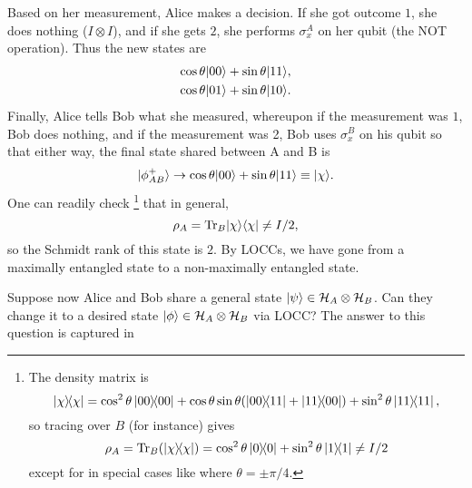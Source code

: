 Based on her measurement, Alice makes a decision. If she got outcome $1$, she does nothing ($I\otimes I$), and if she gets $2$, she performs $\sigma_x^A$ on her qubit (the NOT operation). Thus the new states are
\begin{gather*}
    \cos\theta \lvert00\rangle+\sin\theta\lvert11\rangle,\\
    \cos\theta \lvert01\rangle + \sin\theta\lvert10\rangle.
\end{gather*}
Finally, Alice tells Bob what she measured, whereupon if the measurement was $1$, Bob does nothing, and if the measurement was 2, Bob uses $\sigma_x^B$ on his qubit so that either way, the final state shared between A and B is
\begin{equation}
    \lvert\phi_{AB}^+\rangle \to \cos\theta \lvert00\rangle + \sin\theta\lvert11\rangle \equiv \lvert\chi\rangle.
\end{equation}
One can readily check%
    \footnote{The density matrix is 
    \begin{equation*}
        \left\lvert{\chi}\middle\rangle\!\middle\langle{\chi}\right\rvert=\cos^2\theta \left\lvert{00}\middle\rangle\!\middle\langle{00}\right\rvert+\cos\theta\sin\theta(\left\lvert 00 \middle\rangle\!\middle\langle 11 \right\rvert+\left\lvert 11 \middle\rangle\!\middle\langle 00 \right\rvert)+\sin^2\theta \left\lvert{11}\middle\rangle\!\middle\langle{11}\right\rvert,
    \end{equation*}
    so tracing over $B$ (for instance) gives
    \begin{equation*}
        \rho_A = \operatorname{Tr}_B(\left\lvert{\chi}\middle\rangle\!\middle\langle{\chi}\right\rvert) = \cos^2\theta \left\lvert{0}\middle\rangle\!\middle\langle{0}\right\rvert+\sin^2\theta \left\lvert{1}\middle\rangle\!\middle\langle{1}\right\rvert \neq I/2
    \end{equation*}
except for in special cases like where $\theta=\pm \pi/4$.
    }
that in general,
\begin{equation}
    \rho_A=\operatorname{Tr}_B \lvert\chi\rangle\langle\chi\rvert \neq I/2,
\end{equation}
so the Schmidt rank of this state is $2$. By LOCCs, we have gone from a maximally entangled state to a non-maximally entangled state.

Suppose now Alice and Bob share a general state $\lvert\psi\rangle\in \mathcal H_A \otimes \mathcal H_B$. Can they change it to a desired state $\lvert\phi\rangle\in \mathcal H_A \otimes \mathcal H_B$ via LOCC? The answer to this question is captured in 

